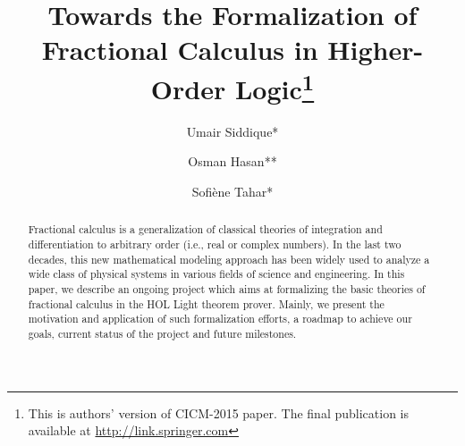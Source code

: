 \documentclass {llncs}
\begin{document}
\pagestyle{empty}

\mainmatter

\title{Towards the Formalization of Fractional Calculus in Higher-Order Logic\thanks{This is authors' version of CICM-2015 paper. The final publication is available at \url{http://link.springer.com}}}
\author{Umair Siddique* \and Osman Hasan** \and Sofi\`{e}ne Tahar*}
 \maketitle


\begin{abstract}
Fractional calculus is a generalization of classical theories of integration
and differentiation to arbitrary order (i.e., real or complex numbers).
In the last two decades, this new mathematical modeling approach has been
widely used to
analyze a wide class of physical systems in various fields of science and
engineering. In this paper, we describe an ongoing project which aims at
formalizing the basic theories of fractional calculus in the HOL Light theorem
prover. Mainly, we present the motivation and application of such formalization
efforts, a roadmap to achieve our goals, current status of the project and future
milestones.
\end{abstract}
\end{document}
